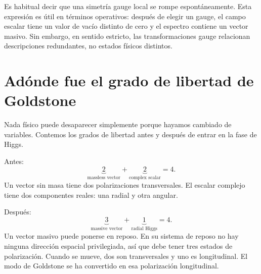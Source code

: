 Es habitual decir que una simetría gauge local se rompe espontáneamente. Esta expresión es útil en términos operativos: después de elegir un gauge, el campo escalar tiene un valor de vacío distinto de cero y el espectro contiene un vector masivo. Sin embargo, en sentido estricto, las transformaciones gauge relacionan descripciones redundantes, no estados físicos distintos.

\section{Adónde fue el grado de libertad de Goldstone}

Nada físico puede desaparecer simplemente porque hayamos cambiado de variables. Contemos los grados de libertad antes y después de entrar en la fase de Higgs.

Antes:
\begin{equation}
  \underbrace{2}_{\text{massless vector}}
  +
  \underbrace{2}_{\text{complex scalar}}
  =4.
\end{equation}
Un vector sin masa tiene dos polarizaciones transversales. El escalar complejo tiene dos componentes reales: una radial y otra angular.

Después:
\begin{equation}
  \underbrace{3}_{\text{massive vector}}
  +
  \underbrace{1}_{\text{radial Higgs}}
  =4.
  \label{eq:l08-degree-count}
\end{equation}
Un vector masivo puede ponerse en reposo. En su sistema de reposo no hay ninguna dirección espacial privilegiada, así que debe tener tres estados de polarización. Cuando se mueve, dos son transversales y uno es longitudinal. El modo de Goldstone se ha convertido en esa polarización longitudinal.

